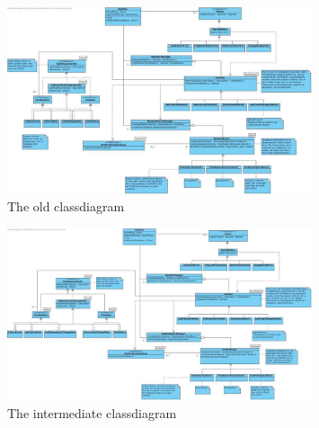 \documentclass[i2]{oss}
\begin{document}


\begin{figure}[tbp]
\begin{center}
    \includegraphics[width=0.8\textwidth]{klassendiagramOud}
    \caption{The old classdiagram}
	\label{fig:kd-oud}
\end{center}
\end{figure}



\begin{figure}[tbp]
\begin{center}
    \includegraphics[width=0.8\textwidth]{klassendiagram}
    \caption{The intermediate classdiagram}
	\label{fig:kd-tt}
\end{center}
\end{figure}
\end{document}
